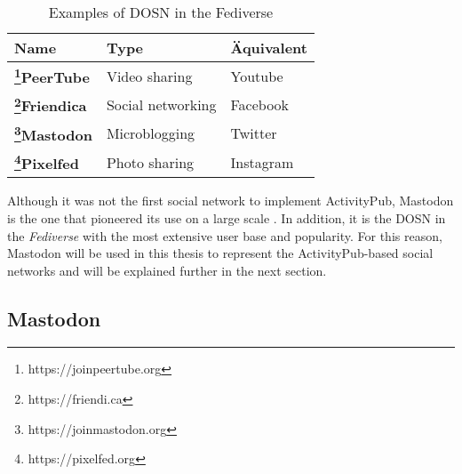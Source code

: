\begin{table}[H]
  \centering
  \begin{tabular}{|p{4cm}|p{4cm}|p{4cm}| }
    \hline
    \textbf{Name} & \textbf{Type} & \textbf{Äquivalent} \\
    \hline
    \hline
    \textbf{\footnote{https://joinpeertube.org}PeerTube} & Video sharing  & Youtube \\
    \textbf{\footnote{https://friendi.ca}Friendica} & Social networking & Facebook \\ 
    \textbf{\footnote{https://joinmastodon.org}Mastodon} & Microblogging & Twitter \\
    \textbf{\footnote{https://pixelfed.org}Pixelfed} & Photo sharing & Instagram \\
      \hline
  \end{tabular}
  \caption{Examples of DOSN in the Fediverse}
  \label{table:fediverse_examples}
\end{table}


Although it was not the first social network to implement ActivityPub, Mastodon is the one that pioneered its use on a large scale \cite{lemmer-webber_2017}. In addition, it is the DOSN in the \emph{Fediverse} with the most extensive user base and popularity. For this reason, Mastodon will be used in this thesis to represent the ActivityPub-based social networks and will be explained further in the next section. 

\subsection{Mastodon}\label{subsec:mastodon}

